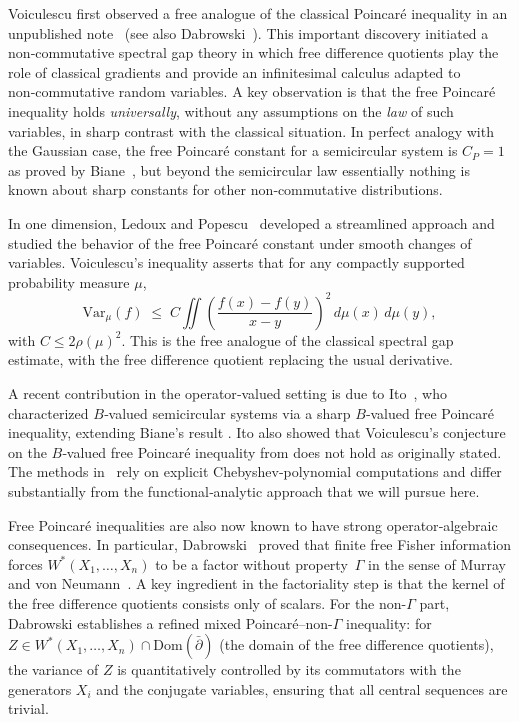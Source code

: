 \documentclass[10pt,a4paper,reqno]{amsart}
\begin{document}
Voiculescu first observed a free analogue of the classical Poincaré inequality in an unpublished
note~\cite{Voipub} (see also Dabrowski~\cite[Lemma~2]{DAB}).  This important discovery initiated a non‑commutative
spectral gap theory in which free difference quotients play the role of classical gradients and
provide an infinitesimal calculus adapted to non‑commutative random variables. A key observation is that the free Poincaré inequality
holds \emph{universally}, without any assumptions on the \emph{law} of such variables, in sharp contrast with the
classical situation.  In perfect analogy with the Gaussian case, the free Poincaré constant for a
semicircular system is $C_P=1$ as proved by Biane~\cite{BLS}, but beyond the semicircular law essentially nothing is
known about sharp constants for other non‑commutative distributions.
\par\vspace{0.5em}
In one dimension, Ledoux and Popescu~\cite{LP} developed a streamlined approach and studied the
behavior of the free Poincaré constant under smooth changes of variables.  Voiculescu’s inequality
asserts that for any compactly supported probability measure $\mu$,
\begin{equation}\label{FPIn}
    \mathrm{Var}_{\mu}(f)
    \;\le\;
    C\iint\!\left(\frac{f(x)-f(y)}{x-y}\right)^2\,d\mu(x)\,d\mu(y),
\end{equation}
with $C\le 2\rho(\mu)^2$.  This is the free analogue of the classical spectral gap estimate, with
the free difference quotient replacing the usual derivative.
\par\vspace{0.5em}
A recent contribution in the operator‑valued setting is due to Ito~\cite{Ito}, who characterized
$B$‑valued semicircular systems via a sharp $B$‑valued free Poincaré inequality, extending Biane’s
result \cite{BLS}.  Ito also showed that Voiculescu’s conjecture on the $B$‑valued free Poincaré
inequality from \cite{Aim} does not hold as originally stated.  The methods in~\cite{Ito} rely on
explicit Chebyshev‑polynomial computations and differ substantially from the functional‑analytic
approach that we will pursue here.
\par\vspace{0.5em}
Free Poincaré inequalities are also now known to have strong operator‑algebraic consequences. In particular, Dabrowski~\cite{DAB} proved that finite free Fisher information forces $W^{*}(X_{1},\ldots,X_{n})$ to be a factor without property~$\Gamma$ in the sense of Murray and von Neumann~\cite{vonN}. A key ingredient in the factoriality step is that the kernel of the free difference quotients consists only of scalars. For the non-$\Gamma$ part, Dabrowski establishes a refined mixed Poincar\'e–non-$\Gamma$ inequality: for 
$Z \in W^*(X_1,\dots,X_n) \cap \mathrm{Dom}(\bar\partial)$ (the domain of the free difference quotients), the variance of $Z$ is quantitatively controlled by its commutators with the generators $X_i$ and the conjugate variables, ensuring that all central sequences are trivial.
\end{document}
